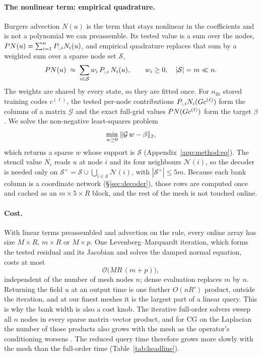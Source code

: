 \documentclass{article}
\begin{document}
\paragraph{The nonlinear term: empirical quadrature.}
Burgers advection $N(u)$ is the term that stays nonlinear in the
coefficients and is not a polynomial we can preassemble. Its tested value
is a sum over the nodes, $P N(u)=\sum_{i=1}^{n}P_{:,i}N_i(u)$,
and empirical quadrature \citep{Hernandez2017EQ,YanoPatera2019LPEQ}
replaces that sum by a weighted sum over a sparse node set $\mathcal S$,
\begin{equation}
  P N(u)\;\approx\;\sum_{i\in\mathcal S} w_i\,P_{:,i}\,N_i(u),
  \qquad w_i\ge 0,\quad |\mathcal S|=m\ll n .
  \label{eq:eq-rule}
\end{equation}
The weights are shared by every state, so they are fitted once. For
$n_{\text{fit}}$ stored training codes $c^{(\ell)}$, the tested per-node
contributions $P_{:,i}N_i(G c^{(\ell)})$ form the columns of a
matrix $\mathcal G$ and the exact full-grid values
$P N(G c^{(\ell)})$ form the target $\beta$. We solve the
non-negative least-squares problem \citep{LawsonHanson1974NNLS}
\begin{equation}
  \min_{w\ge 0}\;\lVert \mathcal G\,w-\beta \rVert_2,
  \label{eq:nnls-main}
\end{equation}
which returns a sparse $w$ whose support is $\mathcal S$
(Appendix~\ref{app:method:eq}). The stencil value $N_i$ reads $u$ at node
$i$ and its four neighbours $\mathcal N(i)$, so the decoder is needed only
on $\mathcal S^{+}=\mathcal S\cup\bigcup_{i\in\mathcal S}\mathcal N(i)$,
with $|\mathcal S^{+}|\le 5m$. Because each bank column is a coordinate
network (\S\ref{sec:decoder}), those rows are computed once and cached as
an $m\times5\times R$ block, and the rest of the mesh is not touched
online.

\paragraph{Cost.}
With linear terms preassembled and advection on the rule, every online
array has size $M\times R$, $m\times R$ or $M\times p$. One
Levenberg--Marquardt iteration, which forms the tested residual and its
Jacobian and solves the damped normal equation, costs at most
\begin{equation}
  \mathcal O\big(MR\,(m+p)\big),
  \label{eq:cost}
\end{equation}
independent of the number of mesh nodes $n$; dense evaluation replaces
$m$ by $n$. Returning the field $u$ at an output time is one further
$O(nR')$ product, outside the iteration, and at our finest meshes it is
the largest part of a linear query. This is why the bank width is also a
cost knob. The iterative full-order solvers sweep all $n$ nodes in every
sparse matrix--vector product, and for CG on the Laplacian the number of
those products also grows with the mesh as the operator's conditioning
worsens \citep{Saad2003}. The reduced query time therefore grows more
slowly with the mesh than the full-order time (Table~\ref{tab:headline}).
\end{document}

